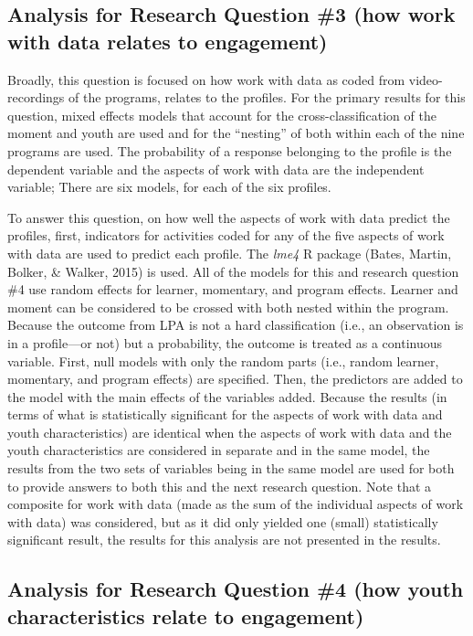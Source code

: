 \documentclass[]{msu-thesis}
\theoremstyle{definition}
\theoremstyle{definition}
\theoremstyle{definition}
\theoremstyle{remark}
\begin{document}
\subsection{Analysis for Research Question \#3 (how work with data
relates to
engagement)}\label{analysis-for-research-question-3-how-work-with-data-relates-to-engagement}

Broadly, this question is focused on how work with data as coded from
video-recordings of the programs, relates to the profiles. For the
primary results for this question, mixed effects models that account for
the cross-classification of the moment and youth are used and for the
``nesting'' of both within each of the nine programs are used. The
probability of a response belonging to the profile is the dependent
variable and the aspects of work with data are the independent variable;
There are six models, for each of the six profiles.

To answer this question, on how well the aspects of work with data
predict the profiles, first, indicators for activities coded for any of
the five aspects of work with data are used to predict each profile. The
\emph{lme4} R package (Bates, Martin, Bolker, \& Walker, 2015) is used.
All of the models for this and research question \#4 use random effects
for learner, momentary, and program effects. Learner and moment can be
considered to be crossed with both nested within the program. Because
the outcome from LPA is not a hard classification (i.e., an observation
is in a profile---or not) but a probability, the outcome is treated as a
continuous variable. First, null models with only the random parts
(i.e., random learner, momentary, and program effects) are specified.
Then, the predictors are added to the model with the main effects of the
variables added. Because the results (in terms of what is statistically
significant for the aspects of work with data and youth characteristics)
are identical when the aspects of work with data and the youth
characteristics are considered in separate and in the same model, the
results from the two sets of variables being in the same model are used
for both to provide answers to both this and the next research question.
Note that a composite for work with data (made as the sum of the
individual aspects of work with data) was considered, but as it did only
yielded one (small) statistically significant result, the results for
this analysis are not presented in the results.

\subsection{Analysis for Research Question \#4 (how youth
characteristics relate to
engagement)}\label{analysis-for-research-question-4-how-youth-characteristics-relate-to-engagement}
\end{document}
